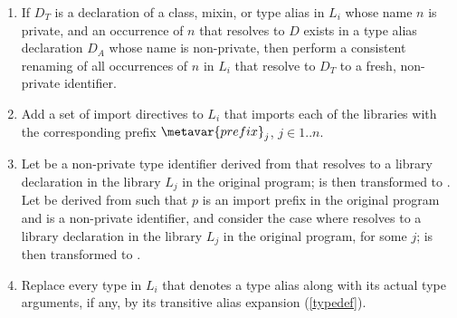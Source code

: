 \documentclass[makeidx]{article}
\begin{document}
{\begin{enumerate}
\item
  If $D_T$ is a declaration of a class, mixin, or type alias in $L_i$
  whose name $n$ is private,
  and an occurrence of $n$ that resolves to $D$
  exists in a type alias declaration $D_A$ whose name is non-private,
  then perform a consistent renaming of
  all occurrences of $n$ in $L_i$ that resolve to $D_T$
  to a fresh, non-private identifier.
\item
  Add a set of import directives to $L_i$ that imports
  each of the libraries  with
  the corresponding prefix $\metavar{prefix}_j$, $j \in 1 .. n$.

\item
  Let \id{} be a non-private type identifier derived from 
  that resolves to a library declaration in the library $L_j$
  in the original program;
  \id{} is then transformed to .
  Let  be derived from  such that $p$ is
  an import prefix in the original program
  and \id{} is a non-private identifier,
  and consider the case where  resolves to
  a library declaration in the library $L_j$ in the original program,
  for some $j$;
   is then transformed to .
\item
  Replace every type in $L_i$ that denotes a type alias
  along with its actual type arguments, if any,
  by its transitive alias expansion
  (\ref{typedef}).
\end{enumerate}

}
\end{document}
